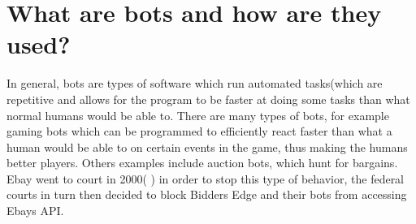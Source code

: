 \section{What are bots and how are they used?}\label{intro:howwhenwhy}
In general, bots are types of software which run automated tasks(which are repetitive and allows for the program to be faster at doing some tasks than what normal humans would be able to. There are many types of bots, for example gaming bots which can be programmed to efficiently react faster than what a human would be able to on certain events in the game, thus making the humans better players. Others examples include auction bots, which hunt for bargains. Ebay went to court in 2000( \cite{Computerworld:Ebay}) in order to stop this type of behavior, the federal courts in turn then decided to block Bidders Edge and their bots from accessing Ebays API.
\\

